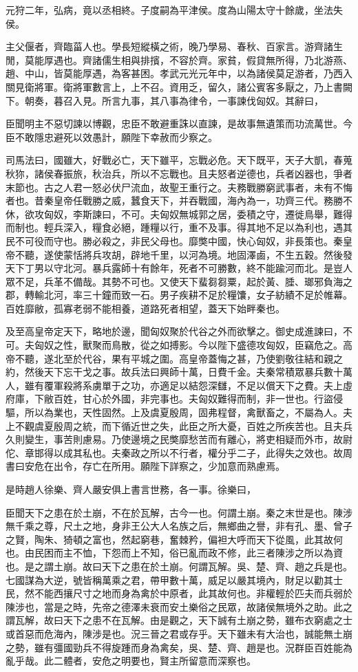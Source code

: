 元狩二年，弘病，竟以丞相終。子度嗣為平津侯。度為山陽太守十餘歲，坐法失侯。

主父偃者，齊臨菑人也。學長短縱橫之術，晚乃學易、春秋、百家言。游齊諸生閒，莫能厚遇也。齊諸儒生相與排擯，不容於齊。家貧，假貸無所得，乃北游燕、趙、中山，皆莫能厚遇，為客甚困。孝武元光元年中，以為諸侯莫足游者，乃西入關見衛將軍。衛將軍數言上，上不召。資用乏，留久，諸公賓客多厭之，乃上書闕下。朝奏，暮召入見。所言九事，其八事為律令，一事諫伐匈奴。其辭曰，

臣聞明主不惡切諫以博觀，忠臣不敢避重誅以直諫，是故事無遺策而功流萬世。今臣不敢隱忠避死以效愚計，願陛下幸赦而少察之。

司馬法曰，國雖大，好戰必亡，天下雖平，忘戰必危。天下既平，天子大凱，春蒐秋狝，諸侯春振旅，秋治兵，所以不忘戰也。且夫怒者逆德也，兵者凶器也，爭者末節也。古之人君一怒必伏尸流血，故聖王重行之。夫務戰勝窮武事者，未有不悔者也。昔秦皇帝任戰勝之威，蠶食天下，并吞戰國，海內為一，功齊三代。務勝不休，欲攻匈奴，李斯諫曰，不可。夫匈奴無城郭之居，委積之守，遷徙鳥舉，難得而制也。輕兵深入，糧食必絕，踵糧以行，重不及事。得其地不足以為利也，遇其民不可役而守也。勝必殺之，非民父母也。靡獘中國，快心匈奴，非長策也。秦皇帝不聽，遂使蒙恬將兵攻胡，辟地千里，以河為境。地固澤鹵，不生五穀。然後發天下丁男以守北河。暴兵露師十有餘年，死者不可勝數，終不能踰河而北。是豈人眾不足，兵革不備哉。其勢不可也。又使天下蜚芻芻粟，起於黃、腄、瑯邪負海之郡，轉輸北河，率三十鐘而致一石。男子疾耕不足於糧馕，女子紡績不足於帷幕。百姓靡敝，孤寡老弱不能相養，道路死者相望，蓋天下始畔秦也。

及至高皇帝定天下，略地於邊，聞匈奴聚於代谷之外而欲擊之。御史成進諫曰，不可。夫匈奴之性，獸聚而鳥散，從之如搏影。今以陛下盛德攻匈奴，臣竊危之。高帝不聽，遂北至於代谷，果有平城之圍。高皇帝蓋悔之甚，乃使劉敬往結和親之約，然後天下忘干戈之事。故兵法曰興師十萬，日費千金。夫秦常積眾暴兵數十萬人，雖有覆軍殺將系虜單于之功，亦適足以結怨深讎，不足以償天下之費。夫上虛府庫，下敝百姓，甘心於外國，非完事也。夫匈奴難得而制，非一世也。行盜侵驅，所以為業也，天性固然。上及虞夏殷周，固弗程督，禽獸畜之，不屬為人。夫上不觀虞夏殷周之統，而下循近世之失，此臣之所大憂，百姓之所疾苦也。且夫兵久則變生，事苦則慮易。乃使邊境之民獘靡愁苦而有離心，將吏相疑而外市，故尉佗、章邯得以成其私也。夫秦政之所以不行者，權分乎二子，此得失之效也。故周書曰安危在出令，存亡在所用。願陛下詳察之，少加意而熟慮焉。

是時趙人徐樂、齊人嚴安俱上書言世務，各一事。徐樂曰，

臣聞天下之患在於土崩，不在於瓦解，古今一也。何謂土崩。秦之末世是也。陳涉無千乘之尊，尺土之地，身非王公大人名族之后，無鄉曲之譽，非有孔、墨、曾子之賢，陶朱、猗頓之富也，然起窮巷，奮棘矜，偏袒大呼而天下從風，此其故何也。由民困而主不恤，下怨而上不知，俗已亂而政不修，此三者陳涉之所以為資也。是之謂土崩。故曰天下之患在於土崩。何謂瓦解。吳、楚、齊、趙之兵是也。七國謀為大逆，號皆稱萬乘之君，帶甲數十萬，威足以嚴其境內，財足以勸其士民，然不能西攘尺寸之地而身為禽於中原者，此其故何也。非權輕於匹夫而兵弱於陳涉也，當是之時，先帝之德澤未衰而安土樂俗之民眾，故諸侯無境外之助。此之謂瓦解，故曰天下之患不在瓦解。由是觀之，天下誠有土崩之勢，雖布衣窮處之士或首惡而危海內，陳涉是也。況三晉之君或存乎。天下雖未有大治也，誠能無土崩之勢，雖有彊國勁兵不得旋踵而身為禽矣，吳、楚、齊、趙是也。況群臣百姓能為亂乎哉。此二體者，安危之明要也，賢主所留意而深察也。

